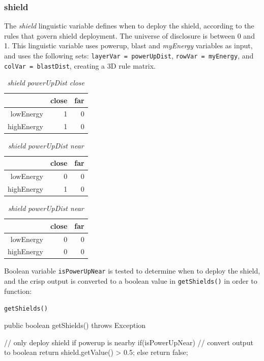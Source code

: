 \subsubsection{shield}

The \emph{shield} linguistic variable defines when to deploy the shield, according to the rules that govern shield deployment. The universe of disclosure is between 0 and 1. This linguistic variable uses powerup, blast and \emph{myEnergy} variables as input, and uses the following sets: \texttt{layerVar = powerUpDist}, \texttt{rowVar = myEnergy}, and \texttt{colVar = blastDist}, creating a 3D rule matrix. 

\begin{table}[H]
\centering
\caption{\emph{shield} \emph{powerUpDist close}}
\begin{tabular}{r|r|r}
 			& close 	& far	 	\\ \hline
lowEnergy	& 1			& 0			\\
highEnergy	& 1			& 0		
\end{tabular}
\end{table}

\begin{table}[H]
\centering
\caption{\emph{shield} \emph{powerUpDist near}}
\begin{tabular}{r|r|r}
 			& close 	& far	 	\\ \hline
lowEnergy	& 0			& 0			\\
highEnergy	& 1			& 0		
\end{tabular}
\end{table}

\begin{table}[H]
\centering
\caption{\emph{shield} \emph{powerUpDist near}}
\begin{tabular}{r|r|r}
 			& close 	& far	 	\\ \hline
lowEnergy	& 0			& 0			\\
highEnergy	& 0			& 0		
\end{tabular}
\end{table}

\noindent
Boolean variable \texttt{isPowerUpNear} is tested to determine when to deploy the shield, and the crisp output is converted to a boolean value in \texttt{getShields()} in order to function:

\begin{listing}[H]
\caption{\texttt{getShields()}}
\begin{javacode}
public boolean getShields() throws Exception {

    // only deploy shield if powerup is nearby
    if(isPowerUpNear) {
        // convert output to boolean
        return shield.getValue() > 0.5;
    } else {
        return false;
    }
}
\end{javacode}
\end{listing}